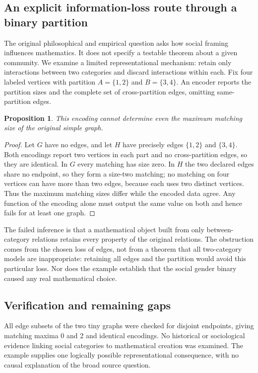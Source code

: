 \documentclass[11pt]{article}
\newtheorem{proposition}{Proposition}
\begin{document}
\subsection{An explicit information-loss route through a binary partition}
The original philosophical and empirical question asks how social framing influences mathematics. It does not specify a testable theorem about a given community. We examine a limited representational mechanism: retain only interactions between two categories and discard interactions within each. Fix four labeled vertices with partition $A=\{1,2\}$ and $B=\{3,4\}$. An encoder reports the partition sizes and the complete set of cross-partition edges, omitting same-partition edges.
\begin{proposition}
This encoding cannot determine even the maximum matching size of the original simple graph.
\end{proposition}
\begin{proof}
Let $G$ have no edges, and let $H$ have precisely edges $\{1,2\}$ and $\{3,4\}$. Both encodings report two vertices in each part and no cross-partition edges, so they are identical. In $G$ every matching has size zero. In $H$ the two declared edges share no endpoint, so they form a size-two matching; no matching on four vertices can have more than two edges, because each uses two distinct vertices. Thus the maximum matching sizes differ while the encoded data agree. Any function of the encoding alone must output the same value on both and hence fails for at least one graph.
\end{proof}
The failed inference is that a mathematical object built from only between-category relations retains every property of the original relations. The obstruction comes from the chosen loss of edges, not from a theorem that all two-category models are inappropriate: retaining all edges and the partition would avoid this particular loss. Nor does the example establish that the social gender binary caused any real mathematical choice.
\subsection{Verification and remaining gaps}
All edge subsets of the two tiny graphs were checked for disjoint endpoints, giving matching maxima 0 and 2 and identical encodings. No historical or sociological evidence linking social categories to mathematical creation was examined. The example supplies one logically possible representational consequence, with no causal explanation of the broad source question.
\end{document}
